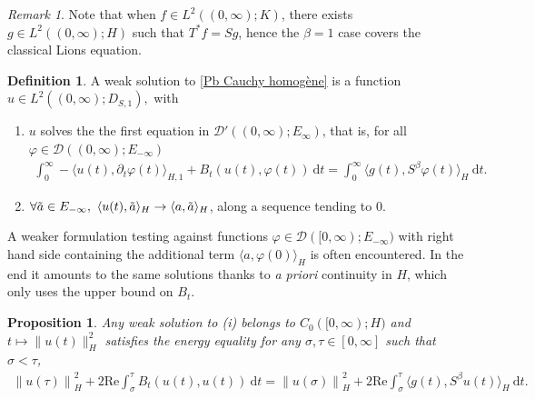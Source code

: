 \documentclass[11pt, letterpaper]{amsart}
\newtheorem{prop}[thm]{Proposition}
\theoremstyle{definition}
\newtheorem{defn}[thm]{Definition}
\theoremstyle{remark}
\newtheorem{rem}[thm]{Remark}
\numberwithin{equation}{section}
\begin{document}
\begin{rem}
Note that when $f \in L^2((0,\infty);K)$, there exists $g\in L^2((0,\infty); H)$ such that $T^*f=Sg$, hence the  $\beta=1$ case  covers the classical Lions equation.
\end{rem}
\begin{defn}
     A weak solution to \eqref{Pb Cauchy homogène} is a function 
    $
        u \in L^2((0,\infty); D_{S,1}),
    $
    with 
    \begin{enumerate}
        \item [(i)]  $u$ solves the the first equation in $\mathcal{D}'((0,\infty);E_\infty)$, that is, for all $\varphi \in \mathcal{D}((0,\infty);E_{-\infty})$
        \begin{align*}
       \int_{0}^{\infty} -\langle u(t), \partial_t{\varphi }(t)\rangle_{H,1} + B_t(u(t),\varphi(t))\  \mathrm d t = 
       \int_{0}^{\infty} \langle g(t), S^\beta \varphi(t)\rangle_{H} \ \mathrm d t.
    \end{align*}
    
     \item [(ii)] $
     \forall \Tilde{a} \in E_{-\infty}, \    \langle u(t),\Tilde{a} \rangle_{H} \rightarrow \langle a, \Tilde{a}\rangle_{H}$, along a sequence tending to $0$.
    
    \end{enumerate}
     
    \end{defn}

A weaker formulation testing against functions $\varphi \in \mathcal{D}([0,\infty);E_{-\infty})$
with right hand side containing the additional term $\langle a, \varphi(0) \rangle_{H}$ is often encountered.
In the end it amounts to the same solutions thanks to \textit{a priori} continuity in $H$,  which only uses the upper bound on $B_t$.

\begin{prop}\label{prop:weaksolCP} Any weak solution to (i) belongs to $C_0([0,\infty); H)$ and $t\mapsto\|u(t)\|_H^2$ satisfies the energy equality
for any  $ \sigma, \tau \in [0,\infty]$ such that $  \sigma < \tau$,
    \begin{align*}
        \left \| u(\tau) \right \|^2_H + 2\mathrm{Re}\int_{\sigma}^{\tau} B_t(u(t),u(t))\  \mathrm d t  = \left \| u(\sigma) \right \|^2_H +  2\mathrm{Re}\int_{\sigma}^{\tau}  
        \langle g(t),S^\beta u(t)\rangle_{H} \  \mathrm d t.
    \end{align*}
    \end{prop}
\end{document}

